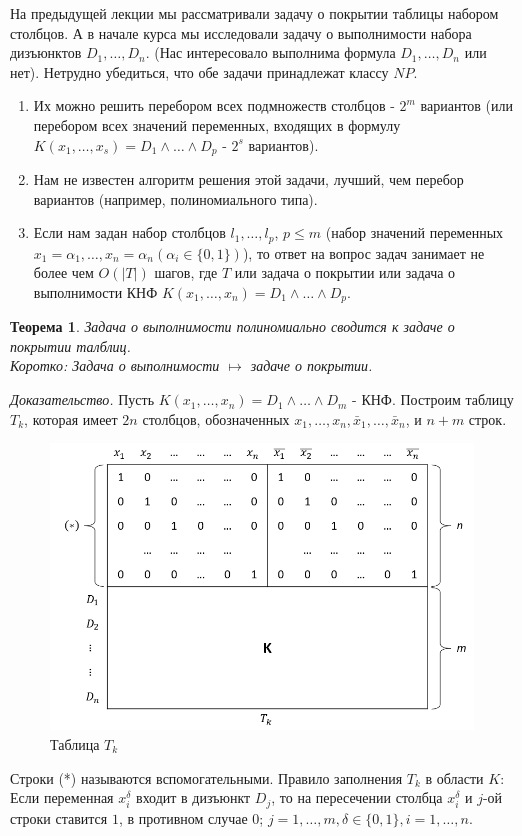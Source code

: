 \documentclass{article}
\newtheorem{theorem}{Теорема}
\numberwithin{example}{section}
\numberwithin{question}{section}
\numberwithin{Remark}{section}
\numberwithin{theorem}{section}
\numberwithin{definition}{section}
\numberwithin{proposition}{section}
\begin{document}
На предыдущей лекции мы рассматривали задачу о покрытии таблицы набором столбцов. А в начале курса мы исследовали задачу о выполнимости набора дизъюнктов $D_1,\ldots,D_n$. (Нас интересовало выполнима формула $D_1,\ldots,D_n$ или нет). Нетрудно убедиться, что обе задачи принадлежат классу $NP$.
\begin{enumerate}
	\item Их можно решить перебором всех подмножеств столбцов - $2^m$ вариантов (или перебором всех значений переменных, входящих в формулу $K(x_1,\ldots,x_s)=D_1\wedge\ldots\wedge D_p$ - $2^s$ вариантов).
	\item Нам не известен алгоритм решения этой задачи, лучший, чем перебор вариантов (например, полиномиального типа).
	\item Если нам задан набор столбцов $l_1,\ldots,l_p$, $p\leqslant m$ (набор значений переменных $x_1=\alpha_1,\ldots,x_n=\alpha_n(\alpha_i\in\{0,1\})$), то ответ на вопрос задач занимает не более чем $O(|T|)$ шагов, где $T$ или задача о покрытии или задача о выполнимости КНФ $K(x_1,\ldots,x_n)=D_1\wedge\ldots\wedge D_p$.
\end{enumerate}
\begin{theorem}
	Задача о выполнимости полиномиально сводится к задаче о покрытии талблиц.\\
	Коротко: Задача о выполнимости $\mapsto$ задаче о покрытии.
\end{theorem}
\emph{Доказательство.} Пусть $K(x_1,\ldots,x_n)=D_1\wedge\ldots\wedge D_m$ - КНФ. Построим таблицу $T_k$, которая имеет $2n$ столбцов, обозначенных $x_1,\ldots,x_n,\bar{x}_1,\ldots,\bar{x}_n$, и $n+m$ строк.
\begin{figure}[!htp]
	\centering
	\includegraphics[width=0.7\linewidth]{12-1}
	\caption{Таблица $T_k$}
	\label{fig:12-1}
\end{figure}
 Строки (*) называются вспомогательными. Правило заполнения $T_k$ в области $K$: Если переменная $x_i^{\delta}$ входит в дизъюнкт $D_j$, то на пересечении столбца $x_i^{\delta}$ и $j$-ой строки ставится $1$, в противном случае $0$; $j=1,\ldots,m,\delta\in\{0,1\},i=1,\ldots,n$.
\end{document}
